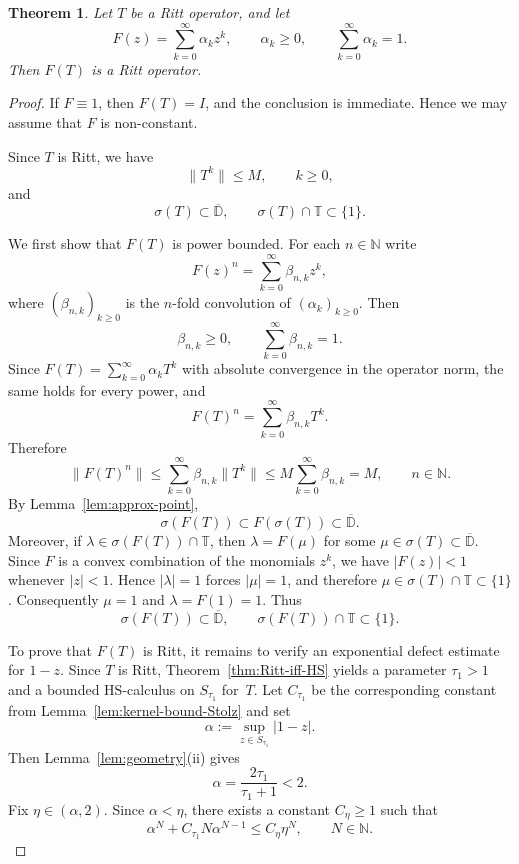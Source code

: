 \documentclass[11pt]{amsart}
\numberwithin{equation}{section}
\newtheorem{theorem}{Theorem}[section]
\theoremstyle{definition}
\theoremstyle{plain}
\def\T{\mathbb{T}}
\def\D{\mathbb{D}}
\newcommand{\HS}{\mathrm{HS}}
\begin{document}
\begin{theorem}\label{thm:convex-combinations-Ritt}
Let $T$ be a Ritt operator, and let
\[
F(z)=\sum_{k=0}^\infty \alpha_k z^k,\qquad \alpha_k\ge 0,\qquad \sum_{k=0}^\infty \alpha_k=1.
\]
Then $F(T)$ is a Ritt operator.
\end{theorem}

\begin{proof}

If $F\equiv1$, then $F(T)=I$, and the conclusion is immediate. Hence we may
assume that $F$ is non-constant.


Since $T$ is Ritt, we have
\begin{equation}\label{eq:convex-ritt-powerbd}
\|T^k\|\le M,\qquad k\ge 0,
\end{equation}
and
\[
\sigma(T)\subset \overline{\D},\qquad \sigma(T)\cap\T\subset\{1\}.
\]

We first show that $F(T)$ is power bounded. For each $n\in\mathbb N$ write
\[
F(z)^n=\sum_{k=0}^\infty \beta_{n,k}z^k,
\]
where $(\beta_{n,k})_{k\ge0}$ is the $n$-fold convolution of $(\alpha_k)_{k\ge0}$. Then
\[
\beta_{n,k}\ge0,\qquad \sum_{k=0}^\infty \beta_{n,k}=1.
\]
Since $F(T)=\sum_{k=0}^\infty \alpha_kT^k$ with absolute convergence in the operator norm, the same holds for every power, and
\[
F(T)^n=\sum_{k=0}^\infty \beta_{n,k}T^k.
\]
Therefore
\begin{equation}\label{eq:convex-ritt-powerbd-F}
\|F(T)^n\|\le \sum_{k=0}^\infty \beta_{n,k}\|T^k\|
\le M\sum_{k=0}^\infty \beta_{n,k}=M,
\qquad n\in\mathbb N.
\end{equation}
By Lemma~\ref{lem:approx-point},
\[
\sigma(F(T))\subset F(\sigma(T))\subset \overline{\D}.
\]
Moreover, if $\lambda\in\sigma(F(T))\cap\T$, then $\lambda=F(\mu)$ for some
$\mu\in\sigma(T)\subset\overline{\D}$. Since $F$ is a convex combination of the monomials $z^k$,
we have $|F(z)|<1$ whenever $|z|<1$. Hence $|\lambda|=1$ forces $|\mu|=1$, and therefore
$\mu\in\sigma(T)\cap\T\subset\{1\}$. Consequently $\mu=1$ and
$\lambda=F(1)=1$. Thus
\begin{equation}\label{eq:convex-ritt-spectrum-F}
\sigma(F(T))\subset \overline{\D},\qquad \sigma(F(T))\cap\T\subset\{1\}.
\end{equation}

To prove that $F(T)$ is Ritt, it remains to verify an exponential defect estimate for
$1-z$. Since $T$ is Ritt, Theorem~\ref{thm:Ritt-iff-HS} yields a parameter $\tau_1>1$ and a bounded \(\HS\)-calculus on $S_{\tau_1}$ for~$T$. 
Let $C_{\tau_1}$ be the corresponding constant from Lemma~\ref{lem:kernel-bound-Stolz} and set 
\[
\alpha:=\sup_{z\in S_{\tau_1}}|1-z|.
\]
Then Lemma~\ref{lem:geometry}\textup{(ii)} gives
\[
        \alpha
        =
        \frac{2\tau_1}{\tau_1+1}
        <2.
\]
Fix $\eta\in(\alpha,2)$. Since $\alpha<\eta$, there exists a constant $C_\eta\ge1$ such that
\begin{equation}\label{eq:convex-ritt-alpha-bound}
\alpha^N+C_{\tau_1}N\alpha^{N-1}\le C_\eta\eta^N,
\qquad N\in\mathbb N.
\end{equation}


\end{proof}
\end{document}
